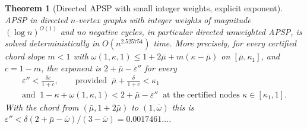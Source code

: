 \documentclass[11pt]{article}
\newtheorem{theorem}{Theorem}
\begin{document}
\begin{theorem}[Directed APSP with small integer weights, explicit exponent]
\label{thm:directed-apsp-explicit}
APSP in directed $n$-vertex graphs with integer weights of magnitude
$(\log n)^{O(1)}$ and no negative cycles, in particular directed unweighted
APSP, is solved deterministically in $O(n^{2.525754})$ time. More precisely,
for every certified chord slope $m<1$ with
$\omega(1,\kappa,1)\le1+2\bar\mu+m(\kappa-\bar\mu)$ on $[\bar\mu,\kappa_1]$,
and $c=1-m$, the exponent is $2+\bar\mu-\varepsilon''$ for every
\begin{gather*}
\varepsilon''<\frac{\delta c}{1+c},\qquad
\text{provided }\ \bar\mu+\frac{\delta}{1+c}<\kappa_1\\
\text{and }\ 1-\kappa+\omega(1,\kappa,1)<2+\bar\mu-\varepsilon''
\ \text{ at the certified nodes }\kappa\in[\kappa_1,1].
\end{gather*}
With the chord from $(\bar\mu,1+2\bar\mu)$ to $(1,\bar\omega)$ this is
$\varepsilon''<\delta(2+\bar\mu-\bar\omega)/(3-\bar\omega)
=0.0017461\ldots$.
\end{theorem}
\end{document}
